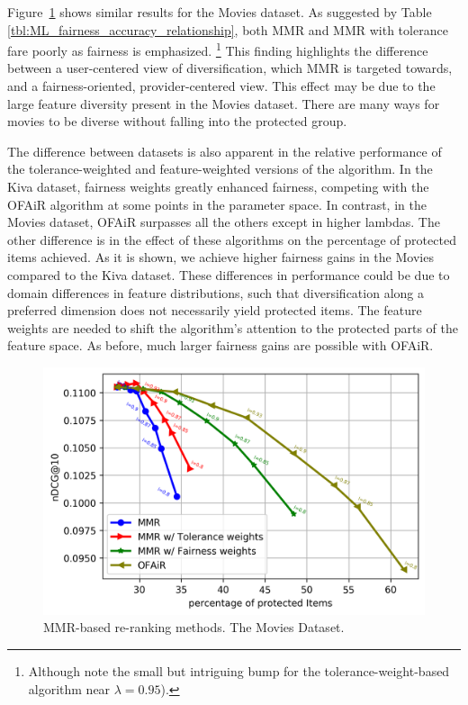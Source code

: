 Figure~\ref{fig:ML_mmr_based_methods} shows similar results for the Movies dataset. As suggested by Table \ref{tbl:ML_fairness_accuracy_relationship}, both MMR and MMR with tolerance fare poorly as fairness is emphasized. \footnote{Although note the small but intriguing bump for the tolerance-weight-based algorithm near $\lambda = 0.95$).} This finding highlights the difference between a user-centered view of diversification, which MMR is targeted towards, and a fairness-oriented, provider-centered view. This effect may be due to the large feature diversity present in the Movies dataset. There are many ways for movies to be diverse without falling into the protected group. 

The difference between datasets is also apparent in the relative performance of the tolerance-weighted and feature-weighted versions of the algorithm. In the Kiva dataset, fairness weights greatly enhanced fairness, competing with the OFAiR algorithm at some points in the parameter space. In contrast, in the Movies dataset, OFAiR surpasses all the others except in higher lambdas. The other difference is in the effect of these algorithms on the percentage of protected items achieved. As it is shown, we achieve higher fairness gains in the Movies compared to the Kiva dataset.
These differences in performance could be due to domain differences in feature distributions, such that diversification along a preferred dimension does not necessarily yield protected items. The feature weights are needed to shift the algorithm's attention to the protected parts of the feature space. As before, much larger fairness gains are possible with OFAiR.

\begin{figure}[tbh]
    \centering
    \includegraphics[width=0.8\linewidth]{imgs/ofair/ml_ndcg_itemCov_CountryGenre_cut.png}
    \caption{MMR-based re-ranking methods. The Movies Dataset.}
    \label{fig:ML_mmr_based_methods}
\end{figure}

